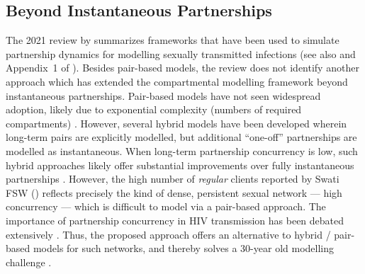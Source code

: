 \subsection{Beyond Instantaneous Partnerships}\label{foi.disc.bip}
The 2021 review by \citet{Rao2021} summarizes frameworks that have been used to
simulate partnership dynamics for modelling sexually transmitted infections
(see also  and Appendix~1 of \cite{Johnson2016a}).
Besides pair-based models, the review does not identify another approach
which has extended the compartmental modelling framework beyond instantaneous partnerships.
Pair-based models have not seen widespread adoption, likely due to
exponential complexity (\ie numbers of required compartments) \cite{Kretzschmar2017}.
However, several hybrid models have been developed \cite{Xiridou2003,Powers2011}
wherein long-term pairs are explicitly modelled,
but additional ``one-off'' partnerships are modelled as instantaneous.
When long-term partnership concurrency is low, such hybrid approaches
likely offer substantial improvements over fully instantaneous partnerships
\cite{Kretzschmar1998,Eames2002,Lloyd-Smith2004}.
However, the high number of \emph{regular} clients reported by Swati FSW ()
reflects precisely the kind of dense, persistent sexual network  --- \ie high concurrency ---
which is difficult to model via a pair-based approach.
The importance of partnership concurrency in HIV transmission has been debated extensively
\cite{Mah2010,Tanser2011,Goodreau2012,Boily2012,Sawers2013}.
Thus, the proposed approach offers an alternative to hybrid / pair-based models for such networks,
and thereby solves a 30-year old modelling challenge \cite{Dietz1988a}.
